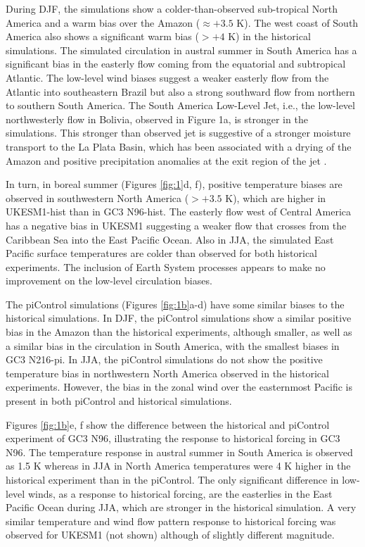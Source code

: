  During DJF, the simulations show a colder-than-observed sub-tropical North America and a warm bias over the Amazon ($\approx +3.5$ K).
 The west coast of South America also shows a significant warm bias ($>+4$ K) in the historical simulations.
 The simulated circulation in austral summer in South America has a significant bias in the easterly flow coming from the equatorial and subtropical Atlantic.
 The low-level wind biases suggest a weaker easterly flow from the Atlantic into southeastern Brazil but also a strong southward flow from northern to southern South America.
  The South America Low-Level Jet, i.e., the low-level northwesterly flow in Bolivia, observed in Figure 1a, is stronger in the simulations.
   This stronger than observed jet is suggestive of a stronger moisture transport to the La Plata Basin, which has been associated with a drying of the Amazon and positive precipitation anomalies at the exit region of the jet \citep{marengo2012,jones2017}.


In turn, in boreal summer (Figures \ref{fig:1}d, f), positive temperature biases are observed in southwestern North America ($>+3.5 $ K), which are higher in UKESM1-hist than in GC3 N96-hist.
 The easterly flow west of Central America has a negative bias in UKESM1 suggesting a weaker flow that crosses from the Caribbean Sea into the East Pacific Ocean.
 Also in JJA, the simulated East Pacific surface temperatures are colder than observed for both historical experiments.      The inclusion of Earth System processes appears to make no  improvement on the low-level circulation biases. 

The piControl simulations (Figures \ref{fig:1b}a-d) have some similar biases to the historical simulations.
 In DJF, the piControl simulations show a similar positive bias in the Amazon than the historical experiments, although smaller, as well as a similar bias in the circulation in South America, with the smallest biases in GC3 N216-pi.
 In JJA, the piControl simulations do not show the positive temperature bias in northwestern North America observed in the historical experiments. However, the bias in the zonal wind over the easternmost Pacific is present in both piControl and historical simulations.
 
 Figures \ref{fig:1b}e, f show the difference between the historical and piControl experiment of GC3 N96, illustrating the response to historical forcing in GC3 N96.
 The temperature response in austral summer in South America is observed as 1.5 K whereas in JJA in North America temperatures were 4 K higher in the historical experiment than in the piControl.
 The only significant difference in low-level winds, as a response to historical forcing, are the easterlies in the East Pacific Ocean during JJA, which are stronger in the historical simulation.
  A very similar temperature and wind flow pattern response to historical forcing was observed for UKESM1 (not shown) although of slightly different magnitude. %

